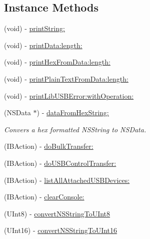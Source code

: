 \subsection*{Instance Methods}
\begin{DoxyCompactItemize}
\item 
(void) -\/ \hyperlink{interface_c_t_app_delegate_addd3afab284b71398cf768928236ec86}{print\-String\-:}
\item 
(void) -\/ \hyperlink{interface_c_t_app_delegate_ac775ffc73129f7d3ff35305d9341a831}{print\-Data\-:length\-:}
\item 
(void) -\/ \hyperlink{interface_c_t_app_delegate_aa1ff2bd3f654a541d2790cf4ebc36386}{print\-Hex\-From\-Data\-:length\-:}
\item 
(void) -\/ \hyperlink{interface_c_t_app_delegate_adc5dedd1eee0e8b1fc126764f1f242dd}{print\-Plain\-Text\-From\-Data\-:length\-:}
\item 
(void) -\/ \hyperlink{interface_c_t_app_delegate_ae7974427860f64ab0225f32237b11179}{print\-Lib\-U\-S\-B\-Error\-:with\-Operation\-:}
\item 
(N\-S\-Data $\ast$) -\/ \hyperlink{interface_c_t_app_delegate_ae71bc249cd087494e9b00e49988b5b55}{data\-From\-Hex\-String\-:}
\begin{DoxyCompactList}\small\item\em Convers a hex formatted N\-S\-String to N\-S\-Data. \end{DoxyCompactList}\item 
(I\-B\-Action) -\/ \hyperlink{interface_c_t_app_delegate_a0061d4cbac40771a21e02323bedbf32b}{do\-Bulk\-Transfer\-:}
\item 
(I\-B\-Action) -\/ \hyperlink{interface_c_t_app_delegate_a477526454468a7a90dd85aaffad30a57}{do\-U\-S\-B\-Control\-Transfer\-:}
\item 
(I\-B\-Action) -\/ \hyperlink{interface_c_t_app_delegate_a21bf37f0abad2c4ba4728db09b3eb6e5}{list\-All\-Attached\-U\-S\-B\-Devices\-:}
\item 
(I\-B\-Action) -\/ \hyperlink{interface_c_t_app_delegate_ae6fb4f8759991c57bfdd0eb1c89821e3}{clear\-Console\-:}
\item 
(U\-Int8) -\/ \hyperlink{interface_c_t_app_delegate_a8e6db21c4bf9f1813527f4951572b3c8}{convert\-N\-S\-String\-To\-U\-Int8}
\item 
(U\-Int16) -\/ \hyperlink{interface_c_t_app_delegate_ae19f27002aa800030e0fa74b2d6b5237}{convert\-N\-S\-String\-To\-U\-Int16}
\end{DoxyCompactItemize}
